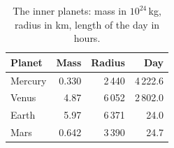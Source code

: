 \begin{table}[h]
\caption{The inner planets: mass in $10^{24}$\,kg, radius in km, length
of the day in hours.}
\begin{tabular*}{\linewidth}{@{\extracolsep{\fill}}lrrr@{}}
\hline
Planet & Mass & Radius & Day \\
\hline
Mercury & 0.330 & 2\,440 & 4\,222.6 \\
Venus   & 4.87  & 6\,052 & 2\,802.0 \\
Earth   & 5.97  & 6\,371 & 24.0 \\
Mars    & 0.642 & 3\,390 & 24.7 \\
\hline
\end{tabular*}
\end{table}
